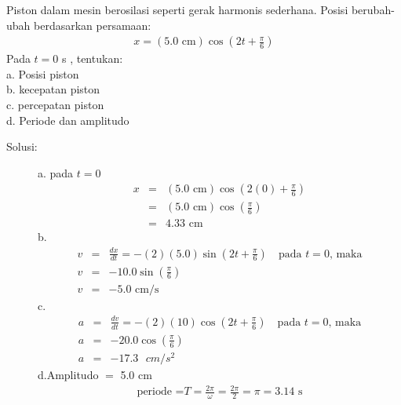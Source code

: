 \item
Piston dalam mesin berosilasi seperti gerak harmonis sederhana. Posisi berubah-ubah berdasarkan persamaan:
\begin{eqnarray*}
x=(5.0 \mbox{ cm})\cos(2t+\frac{\pi}{6})
\end{eqnarray*}
Pada $t=0$ s , tentukan: \\
a. Posisi piston \\
b. kecepatan piston \\
c. percepatan piston \\
d. Periode dan amplitudo
\begin{description}
    \item[Solusi:]
a. pada $t=0$
\begin{eqnarray*}
x&=&(5.0 \mbox{ cm})\cos(2(0)+\frac{\pi}{6}) \\
&=&(5.0 \mbox{ cm})\cos(\frac{\pi}{6}) \\
&=&4.33 \mbox{ cm}
\end{eqnarray*}
b. 
\begin{eqnarray*}
v&=&\frac{dx}{dt}=-(2)(5.0)\sin(2t+\frac{\pi}{6}) \quad \mbox{pada $t=0$, maka} \\
v&=&-10.0 \sin(\frac{\pi}{6}) \\
v&=&-5.0 \mbox{ cm/s}
\end{eqnarray*}
c.
\begin{eqnarray*}
a&=&\frac{dv}{dt}=-(2)(10) \cos(2t+\frac{\pi}{6}) \quad \mbox{pada $t=0$, maka} \\
a&=&-20.0 \cos(\frac{\pi}{6}) \\
a&=&-17.3 \mbox{ $cm/s^2$}
\end{eqnarray*}
d.\quad Amplitudo $=$ 5.0 cm \\
\begin{eqnarray*}
\textrm{periode =}T=\frac{2\pi}{\omega}=\frac{2\pi}{2}=\pi=3.14 \mbox{ s}
\end{eqnarray*}
\\[1.5cm]

\end{description}
